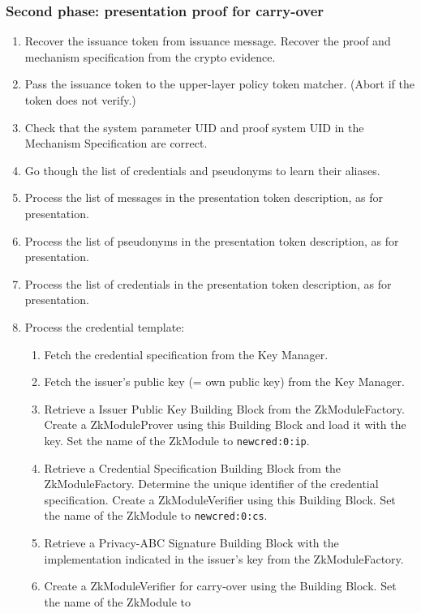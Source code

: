   \subsubsection{Second phase: presentation proof for carry-over}
    \begin{enumerate}
      \item Recover the issuance token from issuance message. Recover the proof and mechanism specification from the crypto evidence.
      \item Pass the issuance token to the upper-layer policy token matcher. (Abort if the token does not verify.)
      \item Check that the system parameter UID and proof system UID in the Mechanism Specification are correct.
      \item Go though the list of credentials and pseudonyms to learn their aliases.
      \item Process the list of messages in the presentation token description, as for presentation.
      \item Process the list of pseudonyms in the presentation token description, as for presentation.
      \item Process the list of credentials in the presentation token description, as for presentation.
      \item Process the credential template:
        \begin{enumerate}
          \item Fetch the credential specification from the Key Manager.
          \item Fetch the issuer's public key (= own public key) from the Key Manager.
          \item Retrieve a Issuer Public Key Building Block from the ZkModuleFactory.
            Create a ZkModuleProver using this Building Block and load it with the key. Set the name of the ZkModule to
            \texttt{newcred:0:ip}.
          \item Retrieve a Credential Specification Building Block from the ZkModuleFactory. Determine the unique identifier
            of the credential specification. Create a ZkModuleVerifier using this Building Block. Set the name of the ZkModule to
            \texttt{newcred:0:cs}.
          \item Retrieve a Privacy-ABC Signature Building Block with the implementation indicated in the issuer's key from the ZkModuleFactory.
          \item Create a ZkModuleVerifier for carry-over using the Building Block. Set the name of the ZkModule to

\end{enumerate}
\end{enumerate}
